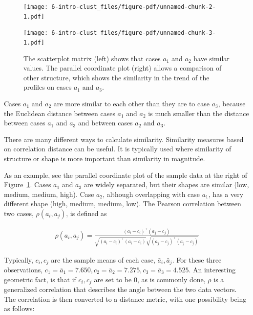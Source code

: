 \documentclass[
  letterpaper,
]{krantz}
\begin{document}
\begin{figure}

\begin{minipage}{0.50\linewidth}

\texttt{[image: 6-intro-clust\_files/figure-pdf/unnamed-chunk-2-1.pdf]}

\end{minipage}%
%
\begin{minipage}{0.50\linewidth}

\texttt{[image: 6-intro-clust\_files/figure-pdf/unnamed-chunk-3-1.pdf]}

\end{minipage}%

\caption{\label{fig-similarity1}The scatterplot matrix (left) shows that
cases \(a_1\) and \(a_2\) have similar values. The parallel coordinate
plot (right) allows a comparison of other structure, which shows the
similarity in the trend of the profiles on cases \(a_1\) and \(a_3\).}

\end{figure}%

\noindent Cases \(a_1\) and \(a_2\) are more similar to each other than
they are to case \(a_3\), because the Euclidean distance between cases
\(a_1\) and \(a_2\) is much smaller than the distance between cases
\(a_1\) and \(a_3\) and between cases \(a_2\) and \(a_3\).

There are many different ways to calculate similarity. Similarity
measures based on correlation distance can be useful. It is typically
used where similarity of structure or shape is more important than
similarity in magnitude.


As an example, see the parallel coordinate plot of the sample data at
the right of Figure~\ref{fig-similarity1}. Cases \(a_1\) and \(a_3\) are
widely separated, but their shapes are similar (low, medium, medium,
high). Case \(a_2\), although overlapping with case \(a_1\), has a very
different shape (high, medium, medium, low). The Pearson correlation
between two cases, \(\rho(a_i,a_j)\), is defined as

\begin{align*}
\rho(a_i,a_j) = \frac{(a_i-c_i)^\top(a_j-c_j)}
{\sqrt{(a_i-c_i)^\top(a_i-c_i)} \sqrt{(a_j-c_j)^\top(a_j-c_j)}}
\label{corc}
\end{align*}

\noindent Typically, \(c_i, c_j\) are the sample means of each case,
\(\bar{a}_i,\bar{a}_j\). For these three observations,
\(c_1=\bar{a}_1=7.650, c_2=\bar{a}_2=7.275, c_3=\bar{a}_3=4.525\). An
interesting geometric fact, is that if \(c_i, c_j\) are set to be 0, as
is commonly done, \(\rho\) is a generalized correlation that describes
the angle between the two data vectors. The correlation is then
converted to a distance metric, with one possibility being as follows:
\end{document}

